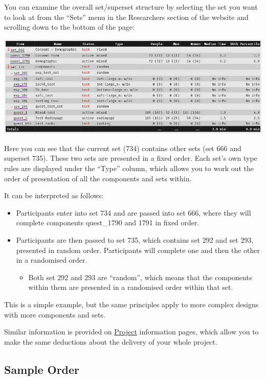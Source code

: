 \documentclass[]{book}
\providecommand{\tightlist}{%
  \setlength{\itemsep}{0pt}\setlength{\parskip}{0pt}}
\begin{document}
You can examine the overall set/superset structure by selecting the set
you want to look at from the ``Sets'' menu in the Researchers section of
the website and scrolling down to the bottom of the page:

\includegraphics{images/screenshots/sets_13.png}

Here you can see that the current set (734) contains other sets (set 666
and superset 735). These two sets are presented in a fixed order. Each
set's own type rules are displayed under the ``Type'' column, which
allows you to work out the order of presentation of all the components
and sets within.

It can be interpreted as follows:

\begin{itemize}
\tightlist
\item
  Participants enter into set 734 and are passed into set 666, where
  they will complete components quest\_1790 and 1791 in fixed order.
\item
  Participants are then passed to set 735, which contains set 292 and
  set 293, presented in random order. Participants will complete one and
  then the other in a randomised order.

  \begin{itemize}
  \tightlist
  \item
    Both set 292 and 293 are ``random'', which means that the components
    within them are presented in a randomised order within that set.
  \end{itemize}
\end{itemize}

This is a simple example, but the same principles apply to more complex
designs with more components and sets.

Similar information is provided on
\protect\hyperlink{project_structure}{Project} information pages, which
allow you to make the same deductions about the delivery of your whole
project.

\hypertarget{sample_order}{\subsection{Sample
Order}\label{sample_order}}
\end{document}
